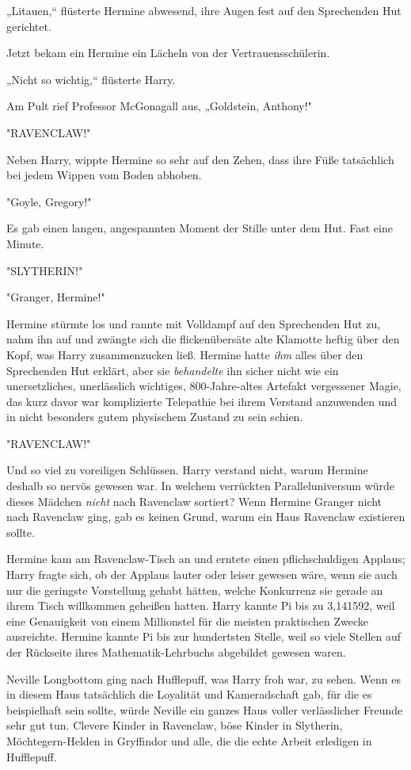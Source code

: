 {„Litauen,“ flüsterte Hermine abwesend, ihre Augen fest auf den Sprechenden Hut gerichtet.

Jetzt bekam ein Hermine ein Lächeln von der Vertrauensschülerin.

„Nicht so wichtig,“ flüsterte Harry.

Am Pult rief Professor McGonagall aus, „Goldstein, Anthony!"

"RAVENCLAW!"

Neben Harry, wippte Hermine so sehr auf den Zehen, dass ihre Füße tatsächlich bei jedem Wippen vom Boden abhoben.

"Goyle, Gregory!"

Es gab einen langen, angespannten Moment der Stille unter dem Hut. Fast eine Minute.

"SLYTHERIN!"

"Granger, Hermine!"

Hermine stürmte los und rannte mit Volldampf auf den Sprechenden Hut zu, nahm ihn auf und zwängte sich die flickenübersäte alte Klamotte heftig über den Kopf, was Harry zusammenzucken ließ. Hermine hatte \emph{ihm} alles über den Sprechenden Hut erklärt, aber sie \emph{behandelte} ihn sicher nicht wie ein unersetzliches, unerlässlich wichtiges, 800-Jahre-altes Artefakt vergessener Magie, das kurz davor war komplizierte Telepathie bei ihrem Verstand anzuwenden und in nicht besonders gutem physischem Zustand zu sein schien.

"RAVENCLAW!"

Und so viel zu voreiligen Schlüssen. Harry verstand nicht, warum Hermine deshalb so nervös gewesen war. In welchem verrückten Paralleluniversum würde dieses Mädchen \emph{nicht} nach Ravenclaw sortiert? Wenn Hermine Granger nicht nach Ravenclaw ging, gab es keinen Grund, warum ein Haus Ravenclaw existieren sollte.

Hermine kam am Ravenclaw-Tisch an und erntete einen pflichschuldigen Applaus; Harry fragte sich, ob der Applaus lauter oder leiser gewesen wäre, wenn sie auch nur die geringste Vorstellung gehabt hätten, welche Konkurrenz sie gerade an ihrem Tisch willkommen geheißen hatten. Harry kannte Pi bis zu 3,141592, weil eine Genauigkeit von einem Millionstel für die meisten praktischen Zwecke ausreichte. Hermine kannte Pi bis zur hundertsten Stelle, weil so viele Stellen auf der Rückseite ihres Mathematik-Lehrbuchs abgebildet gewesen waren.

Neville Longbottom ging nach Hufflepuff, was Harry froh war, zu sehen. Wenn es in diesem Haus tatsächlich die Loyalität und Kameradschaft gab, für die es beispielhaft sein sollte, würde Neville ein ganzes Haus voller verlässlicher Freunde sehr gut tun. Clevere Kinder in Ravenclaw, böse Kinder in Slytherin, Möchtegern-Helden in Gryffindor und alle, die die echte Arbeit erledigen in Hufflepuff.

}
